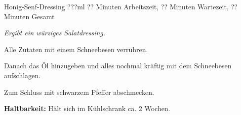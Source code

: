 \begin{recipe}{Honig-Senf-Dressing} {???ml} {?? Minuten Arbeitszeit, ?? Minuten Wartezeit, ?? Minuten Gesamt}

  \freeform{}\textit{Ergibt ein würziges Salatdressing.}


  Alle Zutaten mit einem Schneebesen verrühren.


  Danach das Öl hinzugeben und alles nochmal kräftig mit dem Schneebesen aufschlagen.


  Zum Schluss mit schwarzem Pfeffer abschmecken.

  \freeform{}\hrulefill{}

  \freeform{}\textbf{Haltbarkeit:}
  Hält sich im Kühlschrank ca. 2 Wochen.

\end{recipe}
